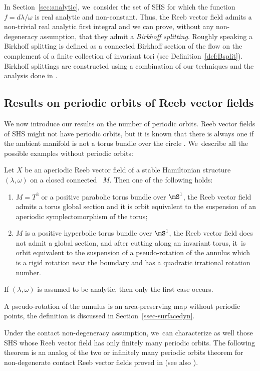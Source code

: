 In Section~\ref{sec:analytic}, we~consider the set of SHS for which the function $f=d\lambda/\omega$ is real analytic and non-constant. Thus, the Reeb vector field admits a non-trivial real analytic first integral and we can prove, without any non-degeneracy assumption, that they admit a \emph{Birkhoff splitting}.
Roughly speaking a Birkhoff splitting is defined as a connected Birkhoff section of the flow on the complement of a finite collection of invariant tori (see Definition~\ref{def:Bsplit}). Birkhoff splittings are constructed using a combination of our techniques and the analysis done in \cite{CV2}.

\subsection{Results on periodic orbits of Reeb vector fields}
We now introduce our results on the number of periodic orbits. Reeb vector fields of SHS might not have periodic orbits, but it is known that there is always one if the ambient manifold is not a torus bundle over the circle \cite{HT,Re}. We~describe all the possible examples without periodic orbits:

\begin{thm}\label{thm:main1}
Let $X$ be an aperiodic Reeb vector field of a stable Hamiltonian structure $(\lambda,\omega)$ on a closed connected \threemanifold~$M$. Then one of the following holds:
\begin{enumerate}
\item $M=T^3$ or a positive parabolic torus bundle over $\mS^1$, the Reeb vector field admits a torus global section and it is orbit equivalent to the suspension of an aperiodic symplectomorphism of the torus;
\item $M$ is a positive hyperbolic torus bundle over $\mS^1$, the Reeb vector field does not admit a global section, and after cutting along an invariant torus, it~is orbit equivalent to the suspension of a pseudo-rotation of the annulus which is a rigid rotation near the boundary and has a quadratic irrational rotation number.
\end{enumerate}
If $(\lambda,\omega)$ is assumed to be analytic, then only the first case occurs.
\end{thm}

A pseudo-rotation of the annulus is an area-preserving map without periodic points, the definition is discussed in Section~\ref{ssec-surfacedyn}.

Under the contact non-degeneracy assumption, we~can characterize as well those SHS whose Reeb vector field has only finitely many periodic orbits. The following theorem is an analog of the two or infinitely many periodic orbits theorem for non-degenerate contact Reeb vector fields proved in \cite{CDR} (see also \cite{HWZ, CgHP}).

